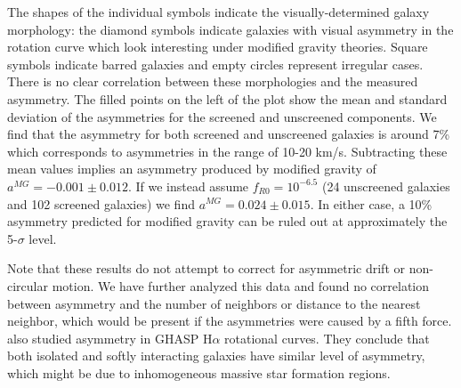 \documentclass[useAMS,usenatbib,twocolumn]{mn2e}
\newcommand{\vinusays}[1]{{\color{blue}[Vinu says: #1]}}
\newcommand{\ha}{H$\alpha$}
\begin{document}
The shapes of the individual symbols indicate the visually-determined galaxy
morphology: the diamond symbols indicate
galaxies with visual asymmetry in the rotation curve which look interesting
under modified gravity theories. Square symbols indicate barred
galaxies and empty circles represent irregular cases.
There is no clear correlation between these morphologies and the
measured asymmetry.   The filled points on the left of the plot show the
mean and standard deviation of the asymmetries for the screened and unscreened
components. We find that the asymmetry for both
screened and unscreened galaxies is around 7\% which corresponds to
asymmetries in the range of 10-20 km/s.
Subtracting these mean values implies an asymmetry produced by modified
gravity of $a^{MG}=-0.001\pm 0.012$.
If we instead assume $f_{R0}=10^{-6.5}$ (24 unscreened galaxies and 102
screened galaxies) we find $a^{MG}=0.024\pm 0.015$.
In either case, a 10\% asymmetry predicted for modified gravity can be
ruled out at approximately the 5-$\sigma$ level.

Note that
these results do not attempt to correct for asymmetric drift or non-circular
motion.  We have further analyzed this data and found no correlation between
asymmetry and the number of neighbors or distance to the nearest neighbor,
which would be present if the asymmetries were caused by a fifth force.
\citet{garrido05} also studied asymmetry in
GHASP \ha{} rotational curves. They conclude that both isolated and softly
interacting galaxies have similar level of asymmetry, which might be due to
inhomogeneous massive star formation regions.


% 
\end{document}
